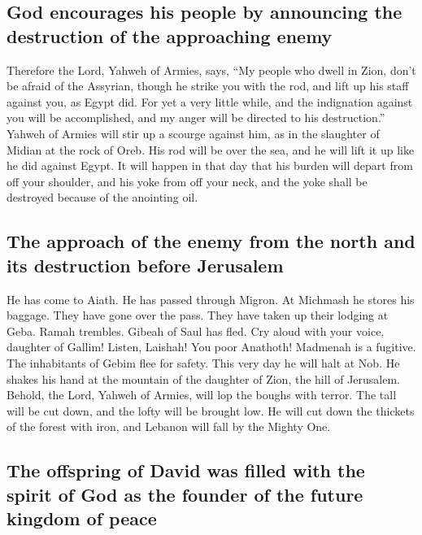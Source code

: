 \hypertarget{god-encourages-his-people-by-announcing-the-destruction-of-the-approaching-enemy}{%
\subsection{God encourages his people by announcing the destruction of
the approaching
enemy}\label{god-encourages-his-people-by-announcing-the-destruction-of-the-approaching-enemy}}

 Therefore the Lord, Yahweh of Armies, says, ``My people
who dwell in Zion, don't be afraid of the Assyrian, though he strike you
with the rod, and lift up his staff against you, as Egypt did.
 For yet a very little while, and the indignation against
you will be accomplished, and my anger will be directed to his
destruction.''  Yahweh of Armies will stir up a scourge
against him, as in the slaughter of Midian at the rock of Oreb. His rod
will be over the sea, and he will lift it up like he did against Egypt.
 It will happen in that day that his burden will depart
from off your shoulder, and his yoke from off your neck, and the yoke
shall be destroyed because of the anointing oil.

\hypertarget{the-approach-of-the-enemy-from-the-north-and-its-destruction-before-jerusalem}{%
\subsection{The approach of the enemy from the north and its destruction
before
Jerusalem}\label{the-approach-of-the-enemy-from-the-north-and-its-destruction-before-jerusalem}}

 He has come to Aiath. He has passed through Migron. At
Michmash he stores his baggage.  They have gone over the
pass. They have taken up their lodging at Geba. Ramah trembles. Gibeah
of Saul has fled.  Cry aloud with your voice, daughter of
Gallim! Listen, Laishah! You poor Anathoth!  Madmenah is
a fugitive. The inhabitants of Gebim flee for safety. 
This very day he will halt at Nob. He shakes his hand at the mountain of
the daughter of Zion, the hill of Jerusalem.  Behold, the
Lord, Yahweh of Armies, will lop the boughs with terror. The tall will
be cut down, and the lofty will be brought low.  He will
cut down the thickets of the forest with iron, and Lebanon will fall by
the Mighty One.

\hypertarget{the-offspring-of-david-was-filled-with-the-spirit-of-god-as-the-founder-of-the-future-kingdom-of-peace}{%
\subsection{The offspring of David was filled with the spirit of God as
the founder of the future kingdom of
peace}\label{the-offspring-of-david-was-filled-with-the-spirit-of-god-as-the-founder-of-the-future-kingdom-of-peace}}

